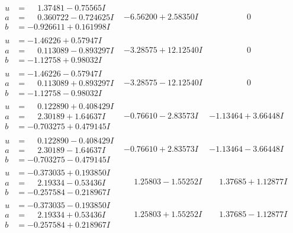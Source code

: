 \documentclass[1p]{elsarticle_modified}
\theoremstyle{definition}
\begin{document}
$$\begin{array}{c|c|c}
\begin{aligned}
u &= \phantom{-}1.37481 - 0.75565 I \\
a &= \phantom{-}0.360722 - 0.724625 I \\
b &= -0.926611 + 0.161998 I\end{aligned}
 & -6.56200 + 2.58350 I & \phantom{-0.000000 } 0 \\ \hline\begin{aligned}
u &= -1.46226 + 0.57947 I \\
a &= \phantom{-}0.113089 - 0.893297 I \\
b &= -1.12758 + 0.98032 I\end{aligned}
 & -3.28575 + 12.12540 I & \phantom{-0.000000 } 0 \\ \hline\begin{aligned}
u &= -1.46226 - 0.57947 I \\
a &= \phantom{-}0.113089 + 0.893297 I \\
b &= -1.12758 - 0.98032 I\end{aligned}
 & -3.28575 - 12.12540 I & \phantom{-0.000000 } 0 \\ \hline\begin{aligned}
u &= \phantom{-}0.122890 + 0.408429 I \\
a &= \phantom{-}2.30189 + 1.64637 I \\
b &= -0.703275 + 0.479145 I\end{aligned}
 & -0.76610 - 2.83573 I & -1.13464 + 3.66448 I \\ \hline\begin{aligned}
u &= \phantom{-}0.122890 - 0.408429 I \\
a &= \phantom{-}2.30189 - 1.64637 I \\
b &= -0.703275 - 0.479145 I\end{aligned}
 & -0.76610 + 2.83573 I & -1.13464 - 3.66448 I \\ \hline\begin{aligned}
u &= -0.373035 + 0.193850 I \\
a &= \phantom{-}2.19334 - 0.53436 I \\
b &= -0.257584 - 0.218967 I\end{aligned}
 & \phantom{-}1.25803 - 1.55252 I & \phantom{-}1.37685 + 1.12877 I \\ \hline\begin{aligned}
u &= -0.373035 - 0.193850 I \\
a &= \phantom{-}2.19334 + 0.53436 I \\
b &= -0.257584 + 0.218967 I\end{aligned}
 & \phantom{-}1.25803 + 1.55252 I & \phantom{-}1.37685 - 1.12877 I \\ \hline\begin{aligned}

\end{aligned}
\end{array}$$
\end{document}
